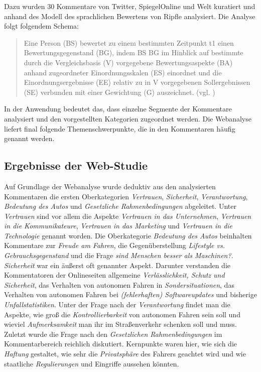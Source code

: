 \documentclass[12pt]{article}
\begin{document}
Dazu wurden 30 Kommentare von Twitter, SpiegelOnline und Welt kuratiert und anhand des Modell des sprachlichen Bewertens von Ripfle analysiert. Die Analyse folgt folgendem Schema:

\begin{quote}
  Eine Person (BS) bewertet zu einem bestimmten Zeitpunkt t1 einen Bewertungsgegenstand (BG), indem BS BG im Hinblick auf bestimmte durch die Vergleichsbasis (V) vorgegebene Bewertungsaspekte (BA) anhand zugeordneter Einordnungsskalen (ES) einordnet und die Einordnungsergebnisse (EE) relativ zu in V vorgegebenen Sollergebnissen (SE) verbunden mit einer Gewichtung (G) auszeichnet. (vgl. \cite[155]{sandig1987textwissen})
\end{quote}

In der Anwendung bedeutet das, dass einzelne Segmente der Kommentare analysiert und den vorgestellten Kategorien zugeordnet werden. Die Webanalyse liefert final folgende Themenschwerpunkte, die in den Kommentaren häufig genannt werden.

\subsection{Ergebnisse der Web-Studie}

Auf Grundlage der Webanalyse wurde deduktiv aus den analysierten Kommentaren die ersten Oberkategorien \emph{Vertrauen}, \emph{Sicherheit}, \emph{Verantwortung}, \emph{Bedeutung des Autos} und \emph{Gesetzliche Rahmenbedingungen} abgeleitet.
Unter \emph{Vertrauen} sind vor allem die Aspekte \emph{Vertrauen in das Unternehmen}, \emph{Vertrauen in die Kommunikateure}, \emph{Vertrauen in das Marketing} und \emph{Vertrauen in die Technologie} genannt worden.
Die Oberkategorie \emph{Bedeutung des Autos} beinhalten Kommentare zur \emph{Freude am Fahren}, die Gegenüberstellung \emph{Lifestyle vs. Gebrauchsgegenstand} und die Frage \emph{sind Menschen besser als Maschinen?}.
\emph{Sicherheit} war ein äußerst oft genannter Aspekt. Darunter verstanden die Kommentatoren der Onlineseiten allgemeine \emph{Verlässlichkeit, Schutz und Sicherheit}, das Verhalten von autonomen Fahren in \emph{Sondersituationen}, das Verhalten von autonomen Fahren bei \emph{(fehlerhaften) Softwareupdates} und bisherige \emph{Unfallstatistiken}.
Unter der Frage nach der \emph{Verantwortung} findet man die Aspekte, wie groß die \emph{Kontrollierbarkeit} von autonomen Fahren sein soll und wieviel \emph{Aufmerksamkeit} man ihr im Straßenverkehr schenken soll und muss.
Zuletzt wurde die Frage nach den \emph{Gesetzlichen Rahmenbedingungen} im Kommentarbereich reichlich diskutiert. Kernpunkte waren hier, wie sich die \emph{Haftung} gestaltet, wie sehr die \emph{Privatsphäre} des Fahrers geachtet wird und wie staatliche \emph{Regulierungen} und Eingriffe aussehen könnten.
\end{document}
